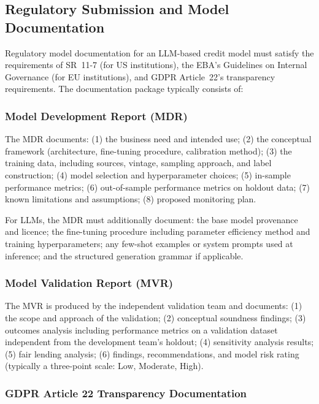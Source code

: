 \begin{context}
\subsection{Regulatory Submission and Model Documentation}
\label{subsec:model-doc}

Regulatory model documentation for an LLM-based credit model must satisfy the requirements of SR~11-7 (for US institutions), the EBA's Guidelines on Internal Governance (for EU institutions), and GDPR Article~22's transparency requirements. The documentation package typically consists of:

\subsubsection*{Model Development Report (MDR)}

The MDR documents: (1) the business need and intended use; (2) the conceptual framework (architecture, fine-tuning procedure, calibration method); (3) the training data, including sources, vintage, sampling approach, and label construction; (4) model selection and hyperparameter choices; (5) in-sample performance metrics; (6) out-of-sample performance metrics on holdout data; (7) known limitations and assumptions; (8) proposed monitoring plan.

For LLMs, the MDR must additionally document: the base model provenance and licence; the fine-tuning procedure including parameter efficiency method and training hyperparameters; any few-shot examples or system prompts used at inference; and the structured generation grammar if applicable.

\subsubsection*{Model Validation Report (MVR)}

The MVR is produced by the independent validation team and documents: (1) the scope and approach of the validation; (2) conceptual soundness findings; (3) outcomes analysis including performance metrics on a validation dataset independent from the development team's holdout; (4) sensitivity analysis results; (5) fair lending analysis; (6) findings, recommendations, and model risk rating (typically a three-point scale: Low, Moderate, High).

\subsubsection*{GDPR Article 22 Transparency Documentation}


\end{context}
